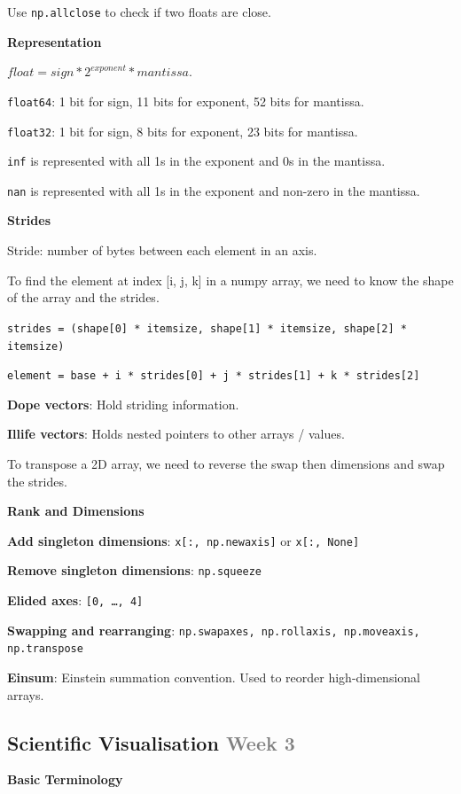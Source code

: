 \documentclass{article}
\begin{document}
Use \texttt{np.allclose} to check if two floats are close.

\textbf{Representation}

$float = sign * 2^{exponent} * mantissa$.

\texttt{float64}: 1 bit for sign, 11 bits for exponent, 52 bits for mantissa.

\texttt{float32}: 1 bit for sign, 8 bits for exponent, 23 bits for mantissa.

\texttt{inf} is represented with all 1s in the exponent and 0s in the mantissa.

\texttt{nan} is represented with all 1s in the exponent and non-zero in the mantissa.

\textbf{Strides}

Stride: number of bytes between each element in an axis.

To find the element at index [i, j, k] in a numpy array, we need to know the shape of the array and the strides.

\texttt{strides = (shape[0] * itemsize, shape[1] * itemsize, shape[2] * itemsize)}

\texttt{element = base + i * strides[0] + j * strides[1] + k * strides[2]}

\textbf{Dope vectors}: Hold striding information.

\textbf{Illife vectors}: Holds nested pointers to other arrays / values.

To transpose a 2D array, we need to reverse the swap then dimensions and swap the strides.

\textbf{Rank and Dimensions}

\textbf{Add singleton dimensions}: \texttt{x[:, np.newaxis]} or \texttt{x[:, None]}

\textbf{Remove singleton dimensions}: \texttt{np.squeeze}

\textbf{Elided axes}: \texttt{[0, \ldots, 4]}

\textbf{Swapping and rearranging}: \texttt{np.swapaxes, np.rollaxis, np.moveaxis, np.transpose}

\textbf{Einsum}: Einstein summation convention. Used to reorder high-dimensional arrays.

\clearpage

\subsection*{Scientific Visualisation \small\textcolor{gray}{Week 3}}

\textbf{Basic Terminology}
\end{document}
